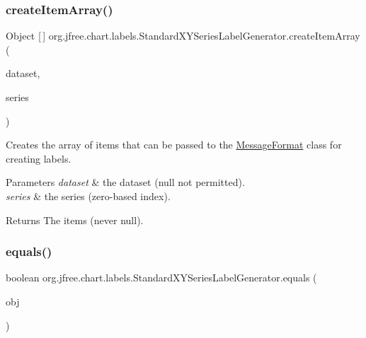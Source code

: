 \subsubsection{\texorpdfstring{create\+Item\+Array()}{createItemArray()}}
{\footnotesize\ttfamily Object \mbox{[}$\,$\mbox{]} org.\+jfree.\+chart.\+labels.\+Standard\+X\+Y\+Series\+Label\+Generator.\+create\+Item\+Array (\begin{DoxyParamCaption}\item[{\mbox{\hyperlink{interfaceorg_1_1jfree_1_1data_1_1xy_1_1_x_y_dataset}{X\+Y\+Dataset}}}]{dataset,  }\item[{int}]{series }\end{DoxyParamCaption})\hspace{0.3cm}{\ttfamily [protected]}}

Creates the array of items that can be passed to the \mbox{\hyperlink{}{Message\+Format}} class for creating labels.


\begin{DoxyParams}{Parameters}
{\em dataset} & the dataset ({\ttfamily null} not permitted). \\
\hline
{\em series} & the series (zero-\/based index).\\
\hline
\end{DoxyParams}
\begin{DoxyReturn}{Returns}
The items (never {\ttfamily null}). 
\end{DoxyReturn}
\mbox{\label{classorg_1_1jfree_1_1chart_1_1labels_1_1_standard_x_y_series_label_generator_ae59acaaf79ccd9cf931f0ab2c63bb234}} 
\subsubsection{\texorpdfstring{equals()}{equals()}}
{\footnotesize\ttfamily boolean org.\+jfree.\+chart.\+labels.\+Standard\+X\+Y\+Series\+Label\+Generator.\+equals (\begin{DoxyParamCaption}\item[{Object}]{obj }\end{DoxyParamCaption})}

